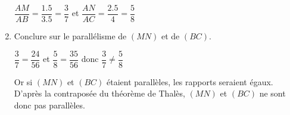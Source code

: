 \begin{corrige}
\begin{multicols}{2}
\begin{spacing}{1.5}
\begin{enumerate}
                {\color{red}
                $\dfrac{AM}{AB}=\dfrac{\num{1.5}}{\num{3.5}}=\dfrac{3}{7}$ et $\dfrac{AN}{AC}=\dfrac{\num{2.5}}{\num{4}}=\dfrac{5}{8}$
                }
                \item Conclure sur le parallélisme de $(MN)$ et de $(BC)$.
                
                {\color{red}
                $\dfrac{3}{7}=\dfrac{24}{56}$ et $\dfrac{5}{8}=\dfrac{35}{56}$ donc $\dfrac{3}{7}\neq\dfrac{5}{8}$

                Or si $(MN)$ et $(BC)$ étaient parallèles, les rapports seraient égaux.               
                D'après la contraposée du théorème de Thalès, $(MN)$ et $(BC)$ ne sont donc pas parallèles.
                }            
            \end{enumerate}
        \end{spacing}
    \end{multicols}
\end{corrige}

